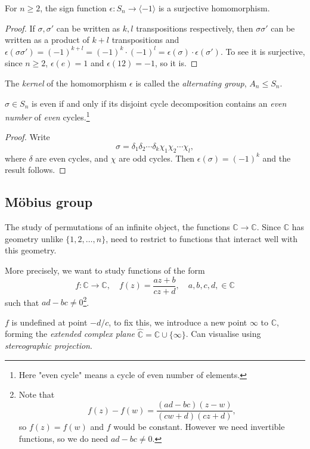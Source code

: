 \documentclass[a4paper]{article}
\begin{document}
\begin{theorem}\label{thm:2.19}
  For $ n\ge 2 $, the sign function $ \epsilon: S_n\to \langle -1
  \rangle $ is a surjective homomorphism.
\end{theorem}
\begin{proof}
  If $ \sigma,\sigma' $ can be written as $k,l$ transpositions
  respectively, then $ \sigma \sigma' $ can be written as a product
  of $k+l$ transpositions and $ \epsilon(\sigma
  \sigma')=(-1)^{k+l}=(-1)^k\cdot (-1)^l=\epsilon(\sigma)\cdot
  \epsilon(\sigma') $. To see it is surjective, since $n\ge 2$, $
  \epsilon(e)=1 $ and $ \epsilon(12)=-1 $, so it is.
\end{proof}
\begin{definition}
  The \textit{kernel} of the homomorphism $ \epsilon $ is called the
  \textit{alternating group}, $ A_n \le S_n$.
\end{definition}
\begin{proposition}\label{prop:2.21}
  $ \sigma\in S_n $ is even if and only if its disjoint cycle
  decomposition contains an \textit{even number} of \textit{even}
  cycles.\footnote{Here "even cycle" means a cycle of even number of elements.}
\end{proposition}
\begin{proof}
  Write
  \[
    \sigma = \delta_1 \delta_2 \cdots \delta_k \chi_1 \chi_2\cdots \chi_{l}
  ,\]
  where $\delta$ are even cycles, and $\chi$ are odd cycles. Then $
  \epsilon(\sigma)=(-1)^{k} $ and the result follows.
\end{proof}
\subsection{M\"{o}bius group}
The study of permutations of an infinite object, the functions $
\mathbb{C} \to \mathbb{C} $. Since $\mathbb{C}$ has geometry unlike $
\{1,2,\dots,n\} $, need to restrict to functions that interact well
with this geometry.

More precisely, we want to study functions of the form
\[
  f:\mathbb{C} \to \mathbb{C}, \quad f(z)=\frac{az+b}{cz+d},\quad
  a,b,c,d,\in \mathbb{C}
\]
such that $ad-bc\neq 0$\footnote{Note that \[
    f(z)-f(w)=\frac{(ad-bc)(z-w)}{(cw+d)(cz+d)}
  ,\]
  so $f(z)=f(w)$ and $f$ would be constant. However we need invertible
functions, so we do need $ad-bc\neq 0$. }.

$f$ is undefined at point $-d/c$, to fix this, we introduce a new
point $ \infty $ to $ \mathbb{C} $, forming the \textit{extended
complex plane} $ \hat{\mathbb{C}}=\mathbb{C} \cup \{\infty\} $. Can
visualise using \textit{stereographic projection}.
\end{document}
